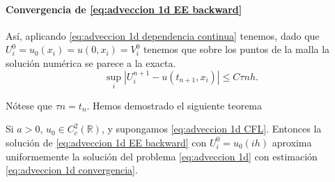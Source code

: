 \paragraph{Convergencia de \eqref{eq:adveccion 1d EE backward}}

Así, aplicando \eqref{eq:adveccion 1d dependencia continua} tenemos, dado que $U_i^0 = u_0(x_i) = u(0, x_i) = V_i^0$ tenemos que sobre los puntos de la malla la solución numérica se parece a la exacta.
\begin{equation}
    \tag{A-E}
    \label{eq:adveccion 1d convergencia}
    \sup_i |U_i^{n+1} - u(t_{n+1}, x_i)| \le  C \tau n h.
\end{equation}

Nótese que $\tau n = t_n$. Hemos demostrado el siguiente teorema
\begin{teorema}
    Si $a > 0$, $u_0 \in C^2_c(\mathbb R)$, y supongamos \eqref{eq:adveccion 1d CFL}. Entonces la solución de \eqref{eq:adveccion 1d EE backward} con $U_i^0 = u_0 (ih)$ aproxima uniformemente la solución del problema \eqref{eq:adveccion 1d} con estimación \eqref{eq:adveccion 1d convergencia}.
\end{teorema}




